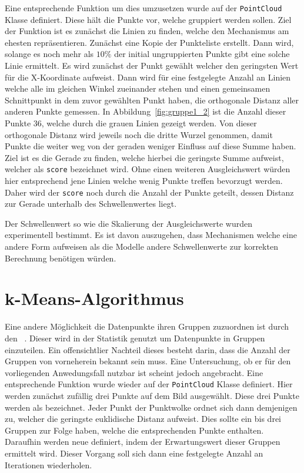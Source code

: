 Eine entsprechende Funktion um dies umzusetzen wurde auf der \lstinline{PointCloud} Klasse definiert.
Diese hält die Punkte vor, welche gruppiert werden sollen.
Ziel der Funktion ist es zunächst die Linien zu finden, welche den Mechanismus am ehesten repräsentieren.
Zunächst eine Kopie der Punkteliste erstellt.
Dann wird, solange es noch mehr als $10\%$ der initial ungruppierten Punkte gibt eine solche Linie ermittelt.
Es wird zunächst der Punkt gewählt welcher den geringsten Wert für die X-Koordinate aufweist.
Dann wird für eine festgelegte Anzahl an Linien welche alle im gleichen Winkel zueinander stehen und einen gemeinsamen Schnittpunkt in dem zuvor gewählten Punkt haben, die orthogonale Distanz aller anderen Punkte gemessen.
In Abbildung~\ref{fig:gruppe1_2} ist die Anzahl dieser Punkte 36, welche durch die grauen Linien gezeigt werden.
Von dieser orthogonale Distanz wird jeweils noch die dritte Wurzel genommen, damit Punkte die weiter weg von der geraden weniger Einfluss auf diese Summe haben.
Ziel ist es die Gerade zu finden, welche hierbei die geringste Summe aufweist, welcher als \lstinline{score} bezeichnet wird.
Ohne einen weiteren Ausgleichswert würden hier entsprechend jene Linien welche wenig Punkte treffen bevorzugt werden.
Daher wird der \lstinline{score} noch durch die Anzahl der Punkte geteilt, dessen Distanz zur Gerade unterhalb des Schwellenwertes liegt.

Der Schwellenwert so wie die Skalierung der Ausgleichswerte wurden experimentell bestimmt.
Es ist davon auszugehen, dass Mechanismen welche eine andere Form aufweisen als die  Modelle andere Schwellenwerte zur korrekten Berechnung benötigen würden.



\section{k-Means-Algorithmus}

Eine andere Möglichkeit die Datenpunkte ihren Gruppen zuzuordnen ist durch den ~\cite[S.~241]{Geron2019}.
Dieser wird in der Statistik genutzt um Datenpunkte in Gruppen einzuteilen.
Ein offensichtlier Nachteil dieses besteht darin, dass die Anzahl der Gruppen von vorneherein bekannt sein muss.
Eine Untersuchung, ob er für den vorliegenden Anwedungsfall nutzbar ist scheint jedoch angebracht.
Eine entsprechende Funktion wurde wieder auf der \lstinline{PointCloud} Klasse definiert.
Hier werden zunächst zufällig drei Punkte auf dem Bild ausgewählt.
Diese drei Punkte werden als  bezeichnet.
Jeder Punkt der Punktwolke ordnet sich dann demjenigen  zu, welcher die geringste euklidische Distanz aufweist.
Dies sollte ein bis drei Gruppen zur Folge haben, welche die entsprechenden Punkte enthalten.
Daraufhin werden neue  definiert, indem der Erwartungswert dieser Gruppen ermittelt wird.
Dieser Vorgang soll sich dann eine festgelegte Anzahl an Iterationen wiederholen.

